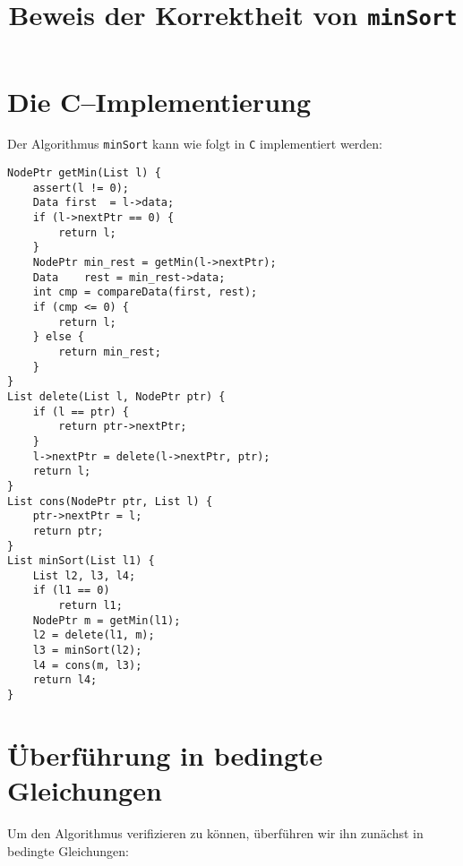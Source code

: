 \documentclass{article}
\title{Beweis der Korrektheit von \texttt{minSort}}
\begin{document}
\maketitle

\section{Die C--Implementierung}
\noindent
Der Algorithmus \texttt{minSort} kann wie folgt in \texttt{C} implementiert werden:
\begin{verbatim}
NodePtr getMin(List l) {
    assert(l != 0);
    Data first  = l->data;
    if (l->nextPtr == 0) {
        return l;
    }
    NodePtr min_rest = getMin(l->nextPtr);
    Data    rest = min_rest->data;
    int cmp = compareData(first, rest);
    if (cmp <= 0) {
        return l;
    } else {
        return min_rest;
    }
}
List delete(List l, NodePtr ptr) {
    if (l == ptr) {
        return ptr->nextPtr;
    }
    l->nextPtr = delete(l->nextPtr, ptr);
    return l;
}
List cons(NodePtr ptr, List l) {
    ptr->nextPtr = l;
    return ptr;
}
List minSort(List l1) {
    List l2, l3, l4;
    if (l1 == 0)
        return l1;
    NodePtr m = getMin(l1);
    l2 = delete(l1, m);
    l3 = minSort(l2);
    l4 = cons(m, l3);
    return l4;
}
\end{verbatim}

\section{Überf\"uhrung in bedingte Gleichungen}
Um den Algorithmus verifizieren zu k\"onnen, \"uberf\"uhren wir ihn zun\"achst in bedingte
Gleichungen:
\end{document}
